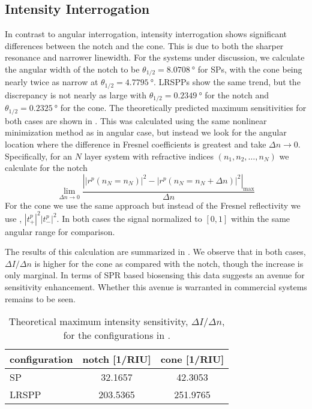 \subsection{Intensity Interrogation}
In contrast to angular interrogation, intensity interrogation shows
significant differences between the notch and the cone.  This is due to
both the sharper resonance and narrower linewidth.  For the systems under
discussion, we calculate the angular width of the notch to be
$\theta_{1/2}=\SI{8.0708}{\degree}$ for SPs, with the cone being nearly
twice as narrow at $\theta_{1/2}=\SI{4.7795}{\degree}$.  LRSPPs show the same
trend, but the discrepancy is not nearly as large with
$\theta_{1/2}=\SI{0.2349}{\degree}$ for the notch and
$\theta_{1/2}=\SI{0.2325}{\degree}$ for the cone.  The theoretically
predicted maximum
sensitivities for both cases are shown in .  This
was calculated using the same nonlinear minimization method as in angular
case, but instead we look for the angular location where the difference in Fresnel
coefficients is greatest and take $\Delta n \to 0$.  Specifically, for an
$N$ layer system with refractive indices $(n_1,n_2, \ldots,n_N)$ we
calculate for the notch
\begin{equation}
								\lim_{\Delta n \to 0}\frac{\left||r^p(n_N=n_N)|^2 - |r^p(n_N=n_N + \Delta n)|^2\right|_\mathrm{max}}{\Delta n}
\label{eqn:fresnelsenspertrubation}
\end{equation}
For the cone we use the same approach but instead of the Fresnel
reflectivity we use , $|t^p_+|^2|t^p_-|^2$.  In
both cases the signal normalized to $[0,1]$ within the same angular range
for comparison.

The results of this calculation are summarized in
.  We observe that in both cases, $\Delta I/\Delta
n$ is higher for the cone as compared with the notch, though the increase
is only marginal.  In terms of SPR based biosensing this data suggests an
avenue for sensitivity enhancement.  Whether this avenue is warranted in
commercial systems remains to be seen.
\begin{table}[ht]
\centering
{}
\begin{tabular}{lSS}
\toprule
{configuration} & {notch [1/RIU]} & {cone [1/RIU]} \\
\midrule
SP & 32.1657 & 42.3053 \\
LRSPP & 203.5365 & 251.9765 \\
\bottomrule
\end{tabular}
\caption{Theoretical maximum intensity sensitivity, $\Delta I/\Delta n$,
								for the configurations in . }
\label{tbl:intensitysens}
\end{table}

